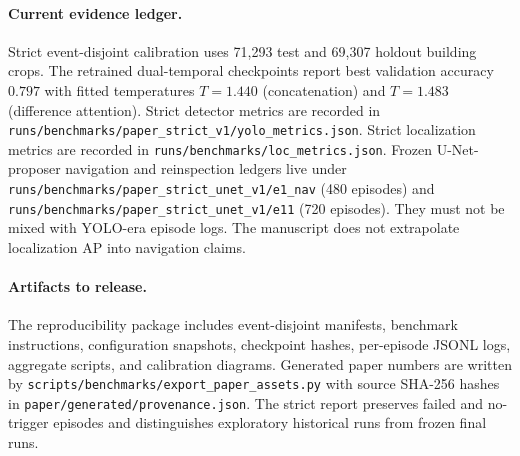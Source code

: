 \paragraph{Current evidence ledger.}
Strict event-disjoint calibration uses 71{,}293 test and 69{,}307 holdout building crops.
The retrained dual-temporal checkpoints report best validation accuracy \(0.797\)
with fitted temperatures \(T=1.440\) (concatenation) and \(T=1.483\) (difference attention).
Strict detector metrics are recorded in
\texttt{runs/benchmarks/paper\_strict\_v1/yolo\_metrics.json}.
Strict localization metrics are recorded in
\texttt{runs/benchmarks/loc\_metrics.json}.
Frozen U-Net-proposer navigation and reinspection ledgers live under
\texttt{runs/benchmarks/paper\_strict\_unet\_v1/e1\_nav} (480 episodes) and
\texttt{runs/benchmarks/paper\_strict\_unet\_v1/e11} (720 episodes).
They must not be mixed with YOLO-era episode logs.
The manuscript does not extrapolate localization AP into navigation claims.

\paragraph{Artifacts to release.}
The reproducibility package includes event-disjoint manifests, benchmark instructions, configuration snapshots, checkpoint hashes, per-episode JSONL logs, aggregate scripts, and calibration diagrams.
Generated paper numbers are written by
\texttt{scripts/benchmarks/export\_paper\_assets.py} with source SHA-256 hashes in
\texttt{paper/generated/provenance.json}.
The strict report preserves failed and no-trigger episodes and distinguishes exploratory historical runs from frozen final runs.
